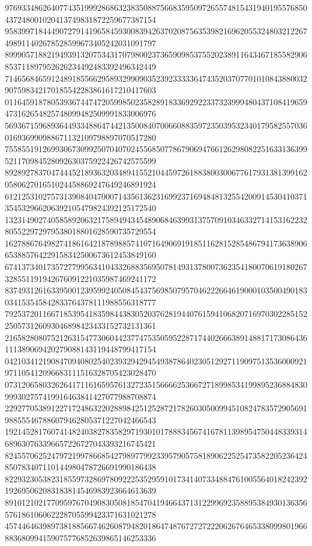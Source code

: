 \begin{DoxyCode}
      976933486264077435199928686323835088756683595097265574815431940195576850437248001020413749831872259677387154
      958399718444907279141965845930083942637020875635398216962055324803212267498911402678528599673405242031091797
      899905718821949391320753431707980023736590985375520238911643467185582906853711897952626234492483392496342449
      714656846591248918556629589329909035239233333647435203707701010843880032907598342170185542283861617210417603
      011645918780539367447472059985023582891833692922337323999480437108419659473162654825748099482509991833006976
      569367159689364493348864744213500840700660883597235039532340179582557036016936990988671132109798897070517280
      755855191269930673099250704070245568507786790694766126298082251633136399521170984528092630375922426742575599
      892892783704744452189363203489415521044597261883800300677617931381399162058062701651024458869247649246891924
      612125310275731390840470007143561362316992371694848132554200914530410371354532966206392105479824392125172540
      132314902740585892063217589494345489068463993137570910346332714153162232805522972979538018801628590735729554
      162788676498274186164218789885741071649069191851162815285486794173638906653885764229158342500673612453849160
      674137340173572779956341043326883569507814931378007362354180070619180267328551191942676091221035987469241172
      837493126163395001239599240508454375698507957046222664619000103500490183034153545842833764378111988556318777
      792537201166718539541835984438305203762819440761594106820716970302285152250573126093046898423433152732131361
      216582808075212631547730604423774753505952287174402666389148817173086436111389069420279088143119448799417154
      042103412190847094080254023932942945493878640230512927119097513536000921971105412096683111516328705423028470
      073120658032626417116165957613272351566662536672718998534199895236884830999302757419916463841427077988708874
      229277053891227172486322028898425125287217826030500994510824783572905691988555467886079462805371227042466543
      192145281760741482403827835829719301017888345674167811398954750448339314689630763396657226727043393216745421
      824557062524797219978668542798977992339579057581890622525473582205236424850783407110144980478726691990186438
      822932305382318559732869780922253529591017341407334884761005564018242392192695062083183814546983923664613639
      891012102177095976704908305081854704194664371312299692358895384930136356576186106062228705599423371631021278
      457446463989738188566746260879482018647487672727222062676465338099801966883680994159075776852639865146253336

\end{DoxyCode}
